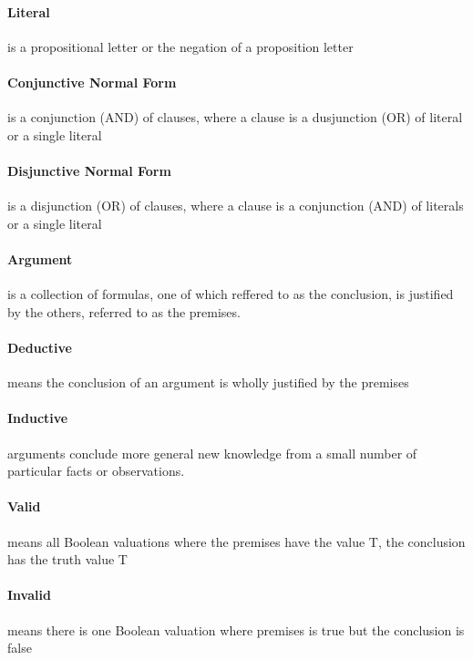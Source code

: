 \documentclass[12pt]{report}
\begin{document}
    \paragraph{Literal} is a propositional letter or the negation of a
    proposition letter

    \paragraph{Conjunctive Normal Form} is a conjunction (AND) of clauses,
    where a clause is a dusjunction (OR) of literal or a single literal

    \paragraph{Disjunctive Normal Form} is a disjunction (OR) of clauses, where
    a clause is a conjunction (AND) of literals or a single literal

    \paragraph{Argument} is a collection of formulas, one of which reffered to
    as the conclusion, is justified by the others, referred to as the premises.

    \paragraph{Deductive} means the conclusion of an argument is wholly
    justified by the premises

    \paragraph{Inductive} arguments conclude more general new knowledge from a
    small number of particular facts or observations.

    \paragraph{Valid} means all Boolean valuations where the premises have the
    value T, the conclusion has the truth value T

    \paragraph{Invalid} means there is one Boolean valuation where premises is
    true but the conclusion is false
\end{document}
